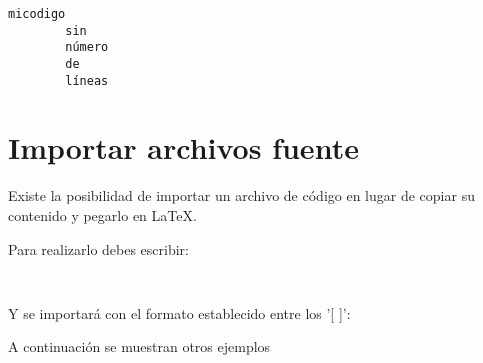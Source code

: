 \begin{lstlisting}[style=Python,numbers=none,title={Ejemplo de código sin número de líneas}]
		micodigo
		sin
		número
		de
		líneas
\end{lstlisting}

\section{Importar archivos fuente}

Existe la posibilidad de importar un archivo de código en lugar de copiar su contenido y pegarlo en \LaTeX.

Para realizarlo debes escribir:

\begin{lstlisting}[style=Latex-color]
	
\end{lstlisting}

Y se importará con el formato establecido entre los '[ ]':
\newpage


A continuación se muestran otros ejemplos

\begin{lstlisting}[style=Latex-color]
	
\end{lstlisting}

	

\begin{lstlisting}[style=Latex-color]
	
\end{lstlisting}




